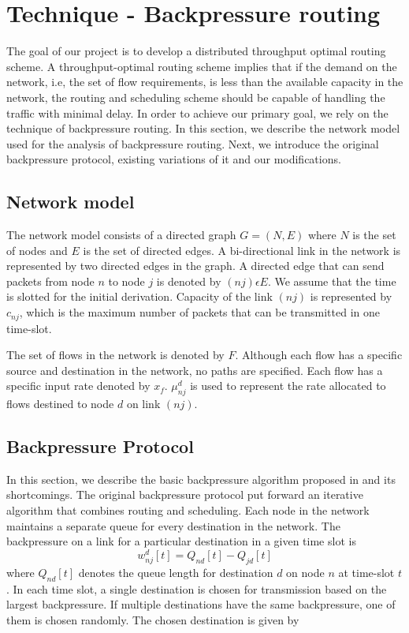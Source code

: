 \label{sec:backPressure}
\section{Technique - Backpressure routing}
The goal of our project is to develop a distributed throughput optimal routing scheme. A throughput-optimal routing scheme implies that if the demand on the network, i.e, the set of flow requirements, is less than the available capacity in the network, the routing and scheduling scheme should be capable of handling the traffic with minimal delay. In order to achieve our primary goal, we rely on the technique of backpressure routing. In this section, we describe the network model used for the analysis of backpressure routing. Next, we introduce the original backpressure protocol, existing variations of it and our modifications.

\subsection{Network model}
The network model consists of a directed graph $G=(N,E)$ where $N$ is the set of nodes and $E$ is the set of directed edges. A bi-directional link in the network is represented by two directed edges in the graph. A directed edge that can send packets from node $n$ to node $j$ is denoted by $(nj) \epsilon E$. We assume that the time is slotted for the initial derivation. Capacity of the link $(nj)$ is represented by $c_{nj}$, which is the maximum number of packets that can be transmitted in one time-slot.

The set of flows in the network is denoted by $F$. Although each flow has a specific source and destination in the network, no paths are specified. Each flow has a specific input rate denoted by $x_{f}$. $\mu_{nj}^{d}$ is used to represent the rate allocated to flows destined to node $d$ on link $(nj)$.

\subsection{Backpressure Protocol}
In this section, we describe the basic backpressure algorithm proposed in \cite{BP-orig} and its shortcomings. The original backpressure protocol put forward an iterative algorithm that combines routing and scheduling. Each node in the network maintains a separate queue for every destination in the network. The backpressure on a link for a particular destination in a given time slot is 
\begin{equation}
w_{nj}^{d}[t] = Q_{nd}[t] - Q_{jd}[t]
\end{equation}
where $Q_{nd}[t]$ denotes the queue length for destination $d$ on node $n$ at time-slot $t$. In each time slot, a single destination is chosen for transmission based on the largest backpressure. If multiple destinations have the same backpressure, one of them is chosen randomly. The chosen destination is given by

